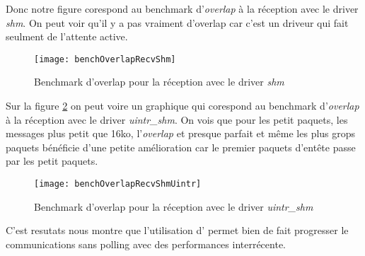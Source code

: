 Donc notre figure corespond au benchmark d'\emph{overlap} à la réception avec le driver \emph{shm}.
On peut voir qu'il y a pas vraiment d'overlap car c'est un driveur qui fait seulment de l'attente active.

\begin{figure}[H]
  \texttt{[image: benchOverlapRecvShm]}
  \caption{Benchmark d'overlap pour la réception avec le driver \emph{shm}}
  \label{fig:benchOverlapRecvShm}
\end{figure}

Sur la figure \ref{fig:benchOverlapRecvShmUintr} on peut voire un graphique qui corespond au benchmark d'\emph{overlap} à la réception avec le driver \emph{uintr_shm}.
On vois que pour les petit paquets, les messages plus petit que 16ko, l'\emph{overlap} et presque parfait et
même les plus grops paquets bénéficie d'une petite amélioration car le premier paquets d'entête passe par les petit paquets.
\begin{figure}[H]
  \texttt{[image: benchOverlapRecvShmUintr]}
  \caption{Benchmark d'overlap pour la réception avec le driver \emph{uintr_shm}}
  \label{fig:benchOverlapRecvShmUintr}
\end{figure}

C'est resutats nous montre que l'utilisation d'\uintr{} permet bien de fait progresser le communications sans polling
avec des performances interrécente.
